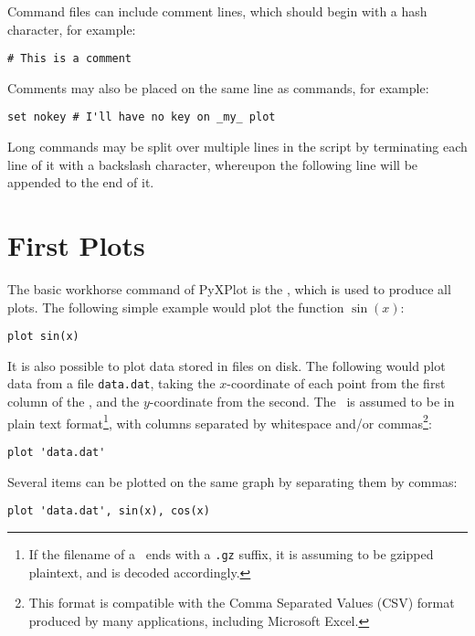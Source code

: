 Command files can include comment lines, which should begin with a hash
character, for example:

\begin{verbatim}
# This is a comment
\end{verbatim}

\noindent Comments may also be placed on the same line as commands, for
example:

\begin{verbatim}
set nokey # I'll have no key on _my_ plot
\end{verbatim}

Long commands may be split over multiple lines in the script by terminating
each line of it with a backslash character, whereupon the following line will
be appended to the end of it.

\section{First Plots}
\label{first_plots}

The basic workhorse command of PyXPlot is the , which is used to
produce all plots. The following simple example would plot the function
$\sin(x)$:

\begin{verbatim}
plot sin(x)
\end{verbatim}

\noindent It is also possible to plot data stored in files on disk. The
following would plot data from a file {\tt data.dat}, taking the
$x$-coordinate of each point from the first column of the \datafile, and the
$y$-coordinate from the second.  The \datafile\ is assumed to be in plain text
format\footnote{If the filename of a \datafile\ ends with a {\tt .gz} suffix,
it is assuming to be gzipped plaintext, and is decoded accordingly.}, with
columns separated by whitespace and/or commas\footnote{This format is
compatible with the Comma Separated Values (CSV) format produced by many
applications, including Microsoft Excel.}:

\begin{verbatim}
plot 'data.dat'
\end{verbatim}

Several items can be plotted on the same graph by separating them by commas:

\begin{verbatim}
plot 'data.dat', sin(x), cos(x)
\end{verbatim}

